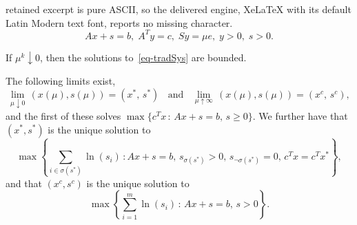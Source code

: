\documentclass[10pt,a4paper]{amsart}
\begin{document}
retained excerpt is pure ASCII, so the delivered engine, XeLaTeX with its default Latin Modern text font, reports no missing character.
\begin{equation} \label{eq-tradSys}
Ax + s = b, \; A^T y = c, \; Sy = \mu e, \; y > 0, \; s > 0.
\end{equation}

\begin{corollary} \label{cor-boundedLevelSet}
If $\mu^k \downarrow 0$, then the solutions to~\eqref{eq-tradSys} 
are bounded.
\end{corollary}

\begin{theorem} \label{thm-converge}
The following limits exist,
\[
\lim_{\mu \downarrow 0} \, (x(\mu), s(\mu)) = (x^*, \, s^*) \;\; \mbox{ and } \;\;
\lim_{\mu \uparrow \infty} \, (x(\mu), s(\mu)) = (x^c, \, s^c),
\]
and the first of these solves $\max \{ c^T x \, : \, Ax + s = b, \, s \ge 0 \}$.
We further have that $(x^*, s^*)$ is the unique solution to
\begin{equation} \label{eq-primalOptAC}
\max \left\{ \sum_{i \in \sigma(s^*)} \ln(s_i) \, : 
        Ax + s = b, \, s_{\sigma(s^*)} > 0, \, s_{\neg\sigma(s^*)} = 0, \, 
        c^T x = c^T x^* \right\}, 
\end{equation}
and that $(x^c, s^c)$ is the unique solution to
\begin{equation} \label{eq-primalAc}
\max \left\{ \sum_{i=1}^{m} \ln(s_i) \, : \, Ax + s = b, \, s > 0 \right\}.
\end{equation}
\end{theorem}
\end{document}
